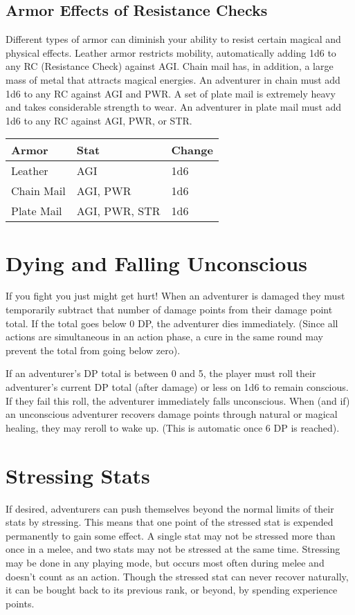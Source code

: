 \subsection{Armor Effects of Resistance Checks}
Different types of armor can diminish your ability to resist certain magical and physical effects. Leather armor restricts mobility, automatically adding 1d6 to any RC (Resistance Check) against AGI. Chain mail has, in addition, a large mass of metal that attracts magical energies. An adventurer in chain must add 1d6 to any RC against AGI and PWR. A set of plate mail is extremely heavy and takes considerable strength to wear. An adventurer in plate mail must add 1d6 to any RC against AGI, PWR, or STR.
\begin{normboxc}
\small
\begin{tabular}{@{} l l l}
Armor & Stat & Change\\
\midrule
Leather & AGI & 1d6\\
Chain Mail & AGI, PWR & 1d6\\
Plate Mail & AGI, PWR, STR & 1d6\\
\end{tabular}
\end{normboxc}
\section{Dying and Falling Unconscious}
If you fight you just might get hurt! When an adventurer is damaged they must temporarily subtract that number of damage points from their damage point total. If the total goes below 0 DP, the adventurer dies immediately. (Since all actions are simultaneous in an action phase, a cure in the same round may prevent the total from going below zero).

If an adventurer's DP total is between 0 and 5, the player must roll their adventurer's current DP total (after damage) or less on 1d6 to remain conscious. If they fail this roll, the adventurer immediately falls unconscious. When (and if) an unconscious adventurer recovers damage points through natural or magical healing, they may reroll to wake up. (This is automatic once 6 DP is reached).
\section{Stressing Stats}
If desired, adventurers can push themselves beyond the normal limits of their stats by stressing. This means that one point of the stressed stat is expended permanently to gain some effect. A single stat may not be stressed more than once in a melee, and two stats may not be stressed at the same time. Stressing may be done in any playing mode, but occurs most often during melee and doesn't count as an action. Though the stressed stat can never recover naturally, it can be bought back to its previous rank, or beyond, by spending experience points.

